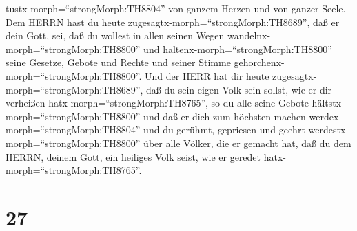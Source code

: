 tustx-morph=``strongMorph:TH8804'' von ganzem Herzen und von ganzer
Seele.  Dem HERRN hast du heute
zugesagtx-morph=``strongMorph:TH8689'', daß er dein Gott, sei, daß du
wollest in allen seinen Wegen wandelnx-morph=``strongMorph:TH8800'' und
haltenx-morph=``strongMorph:TH8800'' seine Gesetze, Gebote und Rechte
und seiner Stimme gehorchenx-morph=``strongMorph:TH8800''. 
Und der HERR hat dir heute zugesagtx-morph=``strongMorph:TH8689'', daß
du sein eigen Volk sein sollst, wie er dir verheißen
hatx-morph=``strongMorph:TH8765'', so du alle seine Gebote
hältstx-morph=``strongMorph:TH8800''  und daß er dich zum
höchsten machen werdex-morph=``strongMorph:TH8804'' und du gerühmt,
gepriesen und geehrt werdestx-morph=``strongMorph:TH8800'' über alle
Völker, die er gemacht hat, daß du dem HERRN, deinem Gott, ein heiliges
Volk seist, wie er geredet hatx-morph=``strongMorph:TH8765''.

\hypertarget{section-26}{%
\section{27}\label{section-26}}

